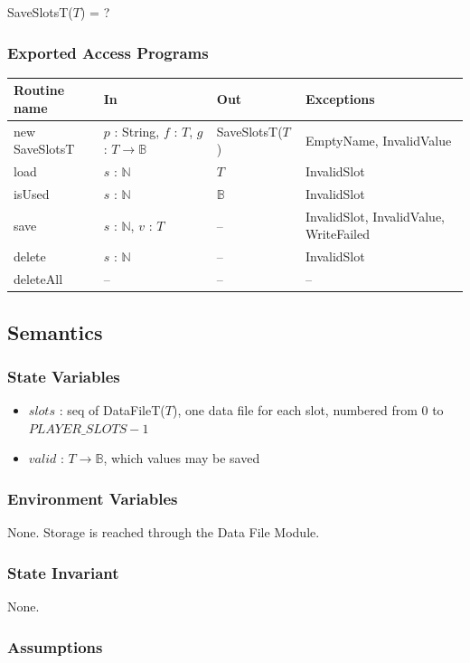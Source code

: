\documentclass[10pt, titlepage]{article}
\newcommand{\B}{\mathbb{B}}
\newcommand{\N}{\mathbb{N}}
\newcommand{\T}[1]{\mathit{#1}}          %
\newenvironment{accessprogs}{%
  \begin{center}\small
  \begin{tabular}{>{\raggedright\arraybackslash}p{3.0cm}
    >{\raggedright\arraybackslash}p{5.0cm}
    >{\raggedright\arraybackslash}p{2.8cm}
    >{\raggedright\arraybackslash}p{3.4cm}}
  \toprule
  \textbf{Routine name} & \textbf{In} & \textbf{Out} & \textbf{Exceptions}\\
  \midrule}{%
  \bottomrule
  \end{tabular}
  \end{center}}
\begin{document}
SaveSlotsT($T$) = ?

\subsubsection{Exported Access Programs}

\begin{accessprogs}
new SaveSlotsT & $p$ : String, $f$ : $T$, $g$ : $T \to \B$ & SaveSlotsT($T$) &
EmptyName, InvalidValue\\
load & $s$ : $\N$ & $T$ & InvalidSlot\\
isUsed & $s$ : $\N$ & $\B$ & InvalidSlot\\
save & $s$ : $\N$, $v$ : $T$ & -- & InvalidSlot, InvalidValue, WriteFailed\\
delete & $s$ : $\N$ & -- & InvalidSlot\\
deleteAll & -- & -- & --\\
\end{accessprogs}

\subsection{Semantics}

\subsubsection{State Variables}

\begin{itemize}
\item $\T{slots}$ : seq of DataFileT($T$), one data file for each slot,
  numbered from 0 to $\T{PLAYER\_SLOTS} - 1$
\item $\T{valid}$ : $T \to \B$, which values may be saved
\end{itemize}

\subsubsection{Environment Variables}

None. Storage is reached through the Data File Module.

\subsubsection{State Invariant}

None.

\subsubsection{Assumptions}
\end{document}
